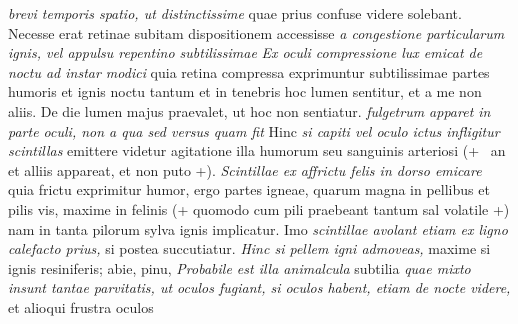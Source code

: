 \textit{brevi temporis spatio, ut distinctissime } quae prius confuse videre solebant. Necesse erat retinae subitam dispositionem accessisse \textit{a congestione particularum ignis, vel appulsu repentino subtilissimae } 
\textit{Ex oculi compressione lux emicat de noctu ad instar modici } quia retina compressa exprimuntur subtilissimae partes humoris et ignis  noctu tantum et in tenebris hoc lumen sentitur, et a me non aliis. De die lumen majus praevalet, ut hoc non sentiatur. 
\textit{fulgetrum apparet in parte oculi, non a qua sed versus quam fit } Hinc \textit{si capiti\protect{} vel oculo ictus infligitur scintillas\protect{}} emittere videtur agitatione illa humorum seu sanguinis arteriosi (+ \Denarius\ an et alliis appareat, et non puto +).
\textit{Scintillae\protect{} ex affrictu felis\protect{} in dorso\protect{} emicare } quia frictu exprimitur humor, ergo partes igneae\protect{}, quarum magna in pellibus et pilis vis, maxime in felinis (+ quomodo cum pili praebeant tantum sal volatile +) nam in tanta pilorum sylva ignis implicatur. Imo \textit{scintillae avolant etiam ex ligno calefacto prius,} si postea succutiatur. \textit{Hinc si pellem igni admoveas,} maxime si ignis  resiniferis\protect{}; abie\protect{}, pinu\protect{},  \textit{Probabile est illa animalcula} subtilia\protect{} \textit{quae mixto insunt tantae parvitatis, ut oculos fugiant, si oculos habent, etiam de nocte videre,} et alioqui frustra oculos 
